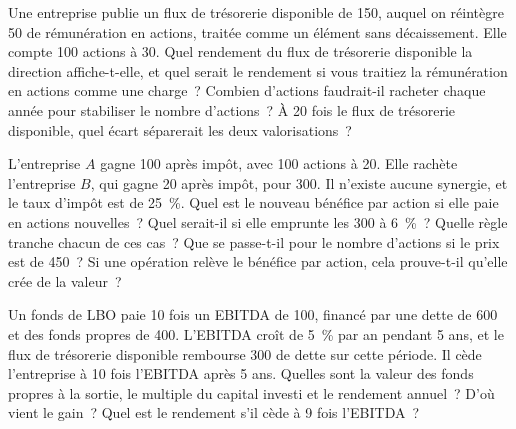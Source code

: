 \begin{question}\label{iq:iv2:valuation-and-financial-statements:16}
Une entreprise publie un flux de trésorerie disponible de 150, auquel on réintègre 50 de rémunération en actions, traitée comme un élément sans décaissement. Elle compte 100 actions à 30. Quel rendement du flux de trésorerie disponible la direction affiche-t-elle, et quel serait le rendement si vous traitiez la rémunération en actions comme une charge~? Combien d'actions faudrait-il racheter chaque année pour stabiliser le nombre d'actions~? À 20 fois le flux de trésorerie disponible, quel écart séparerait les deux valorisations~?
\end{question}

\begin{question}\label{iq:iv2:valuation-and-financial-statements:17}
L'entreprise $A$ gagne 100 après impôt, avec 100 actions à 20. Elle rachète l'entreprise $B$, qui gagne 20 après impôt, pour 300. Il n'existe aucune synergie, et le taux d'impôt est de 25~\%. Quel est le nouveau bénéfice par action si elle paie en actions nouvelles~? Quel serait-il si elle emprunte les 300 à 6~\%~? Quelle règle tranche chacun de ces cas~? Que se passe-t-il pour le nombre d'actions si le prix est de 450~? Si une opération relève le bénéfice par action, cela prouve-t-il qu'elle crée de la valeur~?
\end{question}

\begin{question}\label{iq:iv2:valuation-and-financial-statements:18}
Un fonds de LBO paie 10 fois un EBITDA de 100, financé par une dette de 600 et des fonds propres de 400. L'EBITDA croît de 5~\% par an pendant 5 ans, et le flux de trésorerie disponible rembourse 300 de dette sur cette période. Il cède l'entreprise à 10 fois l'EBITDA après 5 ans. Quelles sont la valeur des fonds propres à la sortie, le multiple du capital investi et le rendement annuel~? D'où vient le gain~? Quel est le rendement s'il cède à 9 fois l'EBITDA~?
\end{question}

